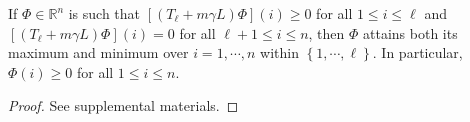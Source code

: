 \documentclass[letterpaper]{article} %
\begin{document}
\begin{lemma}
  \label{lem:maximum-principle}
  If $\Phi\in\mathbb{R}^n$ is such that $\left[\left( T_{\ell}+m\gamma L \right)\Phi\right] \left(i\right)\geq 0$ for all $1\leq i\leq \ell$ and $\left[\left( T_{\ell}+m\gamma L \right)\Phi\right] \left(i\right)=0$ for all $\ell+1\leq i\leq n$, then $\Phi$ attains both its maximum and minimum over $i=1,\cdots,n$ within $\left\{ 1,\cdots,\ell \right\}$. In particular, $\Phi\left(i\right)\geq 0$ for all $1\leq i\leq n$.
\end{lemma}
\begin{proof}
  See supplemental materials.
\end{proof}
\end{document}
